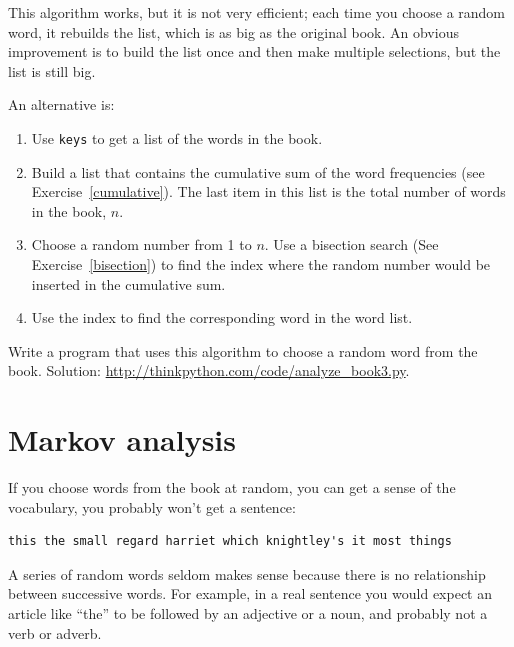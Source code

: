 \documentclass[10pt]{book}
\begin{document}
\begin{CJK}{UTF8}{gbsn}
\begin{exercise}
\label{randhist}

This algorithm works, but it is not very efficient; each time you
choose a random word, it rebuilds the list, which is as big as
the original book.  An obvious improvement is to build the list
once and then make multiple selections, but the list is still big.

An alternative is:

\begin{enumerate}

\item Use {\tt keys} to get a list of the words in the book.

\item Build a list that contains the cumulative sum of the word
  frequencies (see Exercise~\ref{cumulative}).  The last item
  in this list is the total number of words in the book, $n$.
  
\item Choose a random number from 1 to $n$.  Use a bisection search
  (See Exercise~\ref{bisection}) to find the index where the random
  number would be inserted in the cumulative sum.

\item Use the index to find the corresponding word in the word list.

\end{enumerate}

Write a program that uses this algorithm to choose a random
word from the book.  Solution: \url{http://thinkpython.com/code/analyze_book3.py}.

\end{exercise}



\section{Markov analysis}
\label{markov}

If you choose words from the book at random, you can get a
sense of the vocabulary, you probably won't get a sentence:

\begin{verbatim}
this the small regard harriet which knightley's it most things
\end{verbatim}
%
A series of random words seldom makes sense because there
is no relationship between successive words.  For example, in
a real sentence you would expect an article like ``the'' to
be followed by an adjective or a noun, and probably not a verb
or adverb.


\end{CJK}
\end{document}
